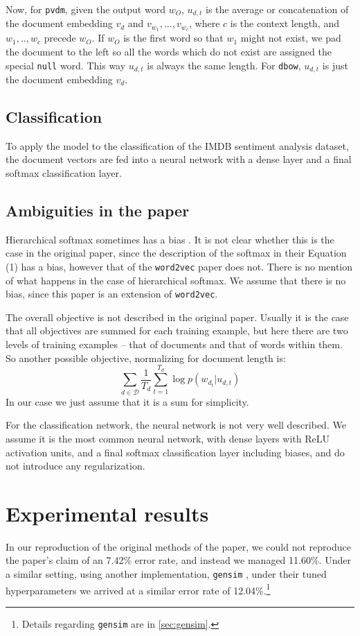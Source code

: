 \documentclass{article}
\begin{document}
Now, for \texttt{pvdm}, given the output word $w_O$, $u_{d,t}$ is the average or concatenation of the document embedding $v_d$ and $v_{w_1},...,v_{w_c}$, where $c$ is the context length, and $w_1,..,w_c$ precede $w_O$. If $w_O$ is the first word so that $w_1$ might not exist, we pad the document to the left so all the words which do not exist are assigned the special \texttt{null} word. This way $u_{d,t}$ is always the same length. For \texttt{dbow}, $u_{d,t}$ is just the document embedding $v_d$.

\subsection{Classification}
To apply the model to the classification of the IMDB sentiment analysis dataset, the document vectors are fed into a neural network with a dense layer and a final softmax classification layer.

\subsection{Ambiguities in the paper}
Hierarchical softmax sometimes has a bias \citep{mnih_scalable_2009}. It is not clear whether this is the case in the original paper, since the description of the softmax in their Equation (1) has a bias, however that of the \texttt{word2vec} paper does not. There is no mention of what happens in the case of hierarchical softmax. We assume that there is no bias, since this paper is an extension of \texttt{word2vec}.

The overall objective is not described in the original paper. Usually it is the case that all objectives are summed for each training example, but here there are two levels of training examples -- that of documents and that of words within them. So another possible objective, normalizing for document length is:
    \[\sum_{d\in\mathcal{D}}\frac{1}{T_d}\sum_{t=1}^{T_d} \log p(w_{d_t}|u_{d,t})\]
In our case we just assume that it is a sum for simplicity.

For the classification network, the neural network is not very well described. We assume it is the most common neural network, with dense layers with ReLU activation units, and a final softmax classification layer including biases, and do not introduce any regularization.

\section{Experimental results}
In our reproduction of the original methods of the paper, we could not reproduce the paper's claim of an 7.42\% error rate, and instead we managed 11.60\%. Under a similar setting, using another implementation, \texttt{gensim} \citep{rehurek_software_2010}, under their tuned hyperparameters we arrived at a similar error rate of 12.04\%.\footnote{Details regarding \texttt{gensim} are in \autoref{sec:gensim}.}
\end{document}

